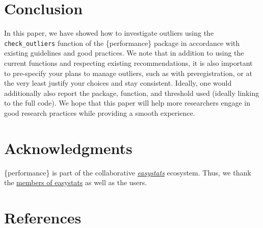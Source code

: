 \documentclass[
]{article}
\begin{document}
\hypertarget{conclusion}{%
\section{Conclusion}\label{conclusion}}

In this paper, we have showed how to investigate outliers using the
\texttt{check\_outliers} function of the \{performance\} package in
accordance with existing guidelines and good practices. We note that in
addition to using the current functions and respecting existing
recommendations, it is also important to pre-specify your plans to
manage outliers, such as with preregistration, or at the very least
justify your choices and stay consistent. Ideally, one would
additionally also report the package, function, and threshold used
(ideally linking to the full code). We hope that this paper will help
more researchers engage in good research practices while providing a
smooth experience.

\hypertarget{acknowledgments}{%
\section{Acknowledgments}\label{acknowledgments}}

\{performance\} is part of the collaborative
\href{https://github.com/easystats/easystats}{\emph{easystats}}
ecosystem. Thus, we thank the
\href{https://github.com/orgs/easystats/people}{members of easystats} as
well as the users.

\hypertarget{references}{%
\section*{References}\label{references}}
\end{document}
